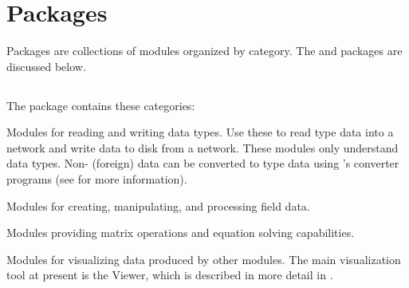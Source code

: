 %
%
%
%
%
%

\chapter{Packages}
\label{ch:packages}

Packages are collections of modules organized by category. The \SR{} and 
packages are discussed below. 

\section{\sr{}}
\label{sec:srpackage}

The \sr{} package contains these categories:

\begin{description}
   Modules for reading and writing \sr{}
  data types.  Use these to read \sr{} type data into a network and
  write data to disk from a network.  These modules only understand 
  \sr{} data types.  Non-\sr{} (foreign) data can be converted to \sr{}
  type data using \sr{}'s converter programs (see  for more information).
  
   Modules for creating, manipulating, and
  processing field data.
  
   Modules providing matrix operations and
  equation solving capabilities.
  
   Modules for visualizing data produced by
  other modules.  The main visualization tool at present
  is the Viewer, which is described in more detail in
  .
\end{description}


